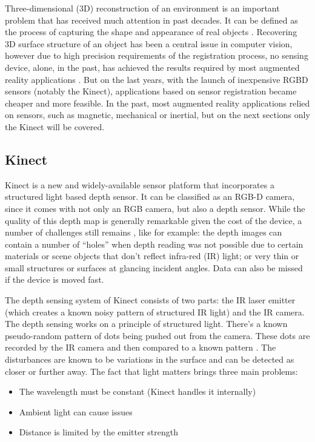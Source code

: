 \documentclass[msc, a4paper, classic, en]{ufbathesis}
\begin{document}
Three-dimensional (3D) reconstruction of an environment is an important problem that has received much attention in past decades. It can be defined as the process of capturing the shape and appearance of real objects \cite{chandra20123}. Recovering 3D surface structure of an object has been a central issue in computer vision, however due to high precision requirements of the registration process, no sensing device, alone, in the past, has achieved the results required by most augmented reality applications \cite{vall98}. But on the last years, with the launch of inexpensive RGBD sensors (notably the Kinect), applications based on sensor registration became cheaper and more feasible. In the past, most augmented reality applications relied on sensors, such as magnetic, mechanical or inertial, but on the next sections only the Kinect will be covered.

\subsection{Kinect}
\label{sec:kinect}

Kinect \cite{kinect} is a new and widely-available sensor platform that incorporates a structured light based depth sensor. It can be classified as an RGB-D camera, since it comes with not only an RGB camera, but also a depth sensor. While the quality of this depth map is generally remarkable given the cost of the device, a number of challenges still remains \cite{kinfu2}, like for example: the depth images can contain a number of ``holes'' when depth reading was not possible due to certain materials or scene objects that don't reflect infra-red (IR) light; or very thin or small structures or surfaces at glancing incident angles. Data can also be missed if the device is moved fast.

The depth sensing system of Kinect consists of two parts: the IR laser emitter (which creates a known noisy pattern of structured IR light) and the IR camera. The depth sensing works on a principle of structured light. There's a known pseudo-random pattern of dots being pushed out from the camera. These dots are recorded by the IR camera and then compared to a known pattern \cite{hackingkinect}. The disturbances are known to be variations in the surface and can be detected as closer or further away. The fact that light matters brings three main problems:

\begin{itemize}
  \item The wavelength must be constant (Kinect handles it internally)
  \item Ambient light can cause issues
  \item Distance is limited by the emitter strength
\end{itemize}
\end{document}
